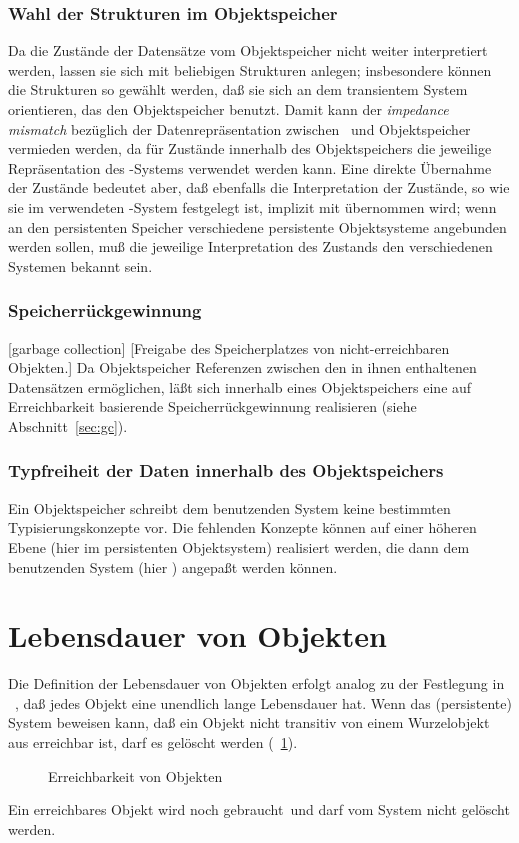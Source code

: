 \subsubsection{Wahl der Strukturen im Objektspeicher}%
%
Da die Zust\"{a}nde der Datens\"{a}tze vom Objektspeicher nicht weiter
interpretiert werden, lassen sie sich mit beliebigen Strukturen
anlegen; insbesondere k\"{o}nnen die Strukturen so gew\"{a}hlt werden, da\ss{}
sie sich an dem transientem System orientieren, das den Objektspeicher
benutzt. Damit kann der {\em impedance mismatch\/} bez\"{u}glich der
Datenrepr\"{a}sentation zwischen \clos\ und Objektspeicher vermieden
werden, da f\"{u}r Zust\"{a}nde innerhalb des Objektspeichers die jeweilige
Repr\"{a}sentation des \cl-Systems verwendet werden kann. Eine
direkte \"{U}bernahme der Zust\"{a}nde bedeutet aber, da\ss{} ebenfalls die
Interpretation der Zust\"{a}nde, so wie sie im  verwendeten \cl-System
festgelegt ist, implizit mit \"{u}bernommen wird; wenn an den
persistenten Speicher verschiedene persistente Objektsysteme
angebunden werden sollen, mu\ss{} die jeweilige Interpretation des
Zustands den verschiedenen Systemen bekannt sein.
%
\subsubsection{Speicherr\"{u}ckgewinnung}%
[garbage collection]%
[Freigabe des Speicherplatzes von nicht-erreichbaren Objekten.]
Da Objektspeicher Referenzen zwischen den in ihnen enthaltenen
Datens\"{a}tzen erm\"{o}glichen, l\"{a}\ss{}t sich innerhalb eines Objektspeichers
eine auf Erreichbarkeit basierende Speicherr\"{u}ckgewinnung realisieren
(siehe Abschnitt~\ref{sec:gc}).
%
\subsubsection{Typfreiheit der Daten innerhalb des Objektspeichers} Ein
Objektspeicher schreibt dem benutzenden
System keine bestimmten Typisierungskonzepte vor. Die fehlenden Konzepte
k\"{o}nnen auf einer h\"{o}heren Ebene (hier im persistenten Objektsystem)
realisiert werden, die dann dem benutzenden System (hier \clos)
angepa\ss{}t werden k\"{o}n\-nen.
%
%
\section{Lebensdauer von Objekten}
%
Die Definition der Lebensdauer von Objekten erfolgt analog zu der
Festlegung in \cl\ , da\ss{} jedes Objekt eine unendlich lange
Lebensdauer hat. Wenn das (persistente) System beweisen kann, da\ss{} ein
Objekt nicht transitiv von einem Wurzelobjekt aus erreichbar ist, darf
es gel\"{o}scht werden (\figurename~\ref{fig:reachabl}). %
%
\begin{figure}[htbp]%
\ifbuch%
\centerline{}%
\else%
\centerline{}%
\fi%
\captionfrom%
 {Erreichbarkeit von Objekten}%
 {\cite[]{bib:th90}}%
 \label{fig:reachabl}%
\end{figure}%
%
Ein erreichbares Objekt \rglq{}wird noch gebraucht\rgrq\ und darf vom
System nicht gel\"{o}scht werden.
%
